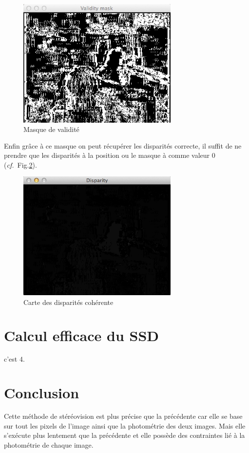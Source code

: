\documentclass[a4paper,10pt]{article}
\begin{document}
\begin{figure}[ht]
\begin{center}
	\includegraphics[width=8cm]{images/masque.png}
\end{center}
	\caption{Masque de validit\'e}
	\label{masque}
\end{figure}


Enfin gr\^ace \`a ce masque on peut r\'ecup\'erer les disparit\'es correcte, il suffit de ne prendre que les disparit\'es \`a la position ou le masque \`a comme valeur 0 (\emph{cf.}~Fig.\ref{disparite}).

\begin{figure}[ht]
\begin{center}
	\includegraphics[width=8cm]{images/disparite.png}
\end{center}
	\caption{Carte des disparit\'es coh\'erente}
	\label{disparite}
\end{figure}


\section{Calcul efficace du SSD}

c'est 4.

\section*{Conclusion}

Cette m\'ethode de st\'er\'eovision est plus pr\'ecise que la pr\'ec\'edente car elle se base sur tout les pixels de l'image ainsi que la photom\'etrie des deux images. Mais elle s'ex\'ecute plus lentement que la pr\'ec\'edente et elle poss\`ede des contraintes li\'e \`a la photom\'etrie de chaque image.
\end{document}
